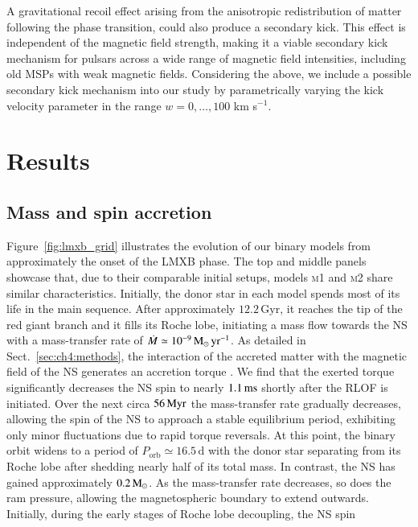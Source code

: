 \documentclass[main.tex]{subfiles}
\begin{document}
    A gravitational recoil effect arising from the anisotropic redistribution of matter following the phase transition, could also produce a secondary kick. This effect is independent of the magnetic field strength, making it a viable secondary kick mechanism for pulsars across a wide range of magnetic field intensities, including old MSPs with weak magnetic fields.
    Considering the above, we include a possible secondary kick mechanism into our study by parametrically varying the kick velocity parameter in the range $w=0, \dots, 100$ km s$^{-1}$.

    \newpage
    \section{Results} \label{sec:ch4:results}
    \subsection{Mass and spin accretion} \label{sec:ch4:pretrans_evolution}
    Figure~\ref{fig:lmxb_grid} illustrates the evolution of our binary models from approximately the onset of the LMXB phase. The top and middle panels showcase that, due to their comparable initial 
    setups,  models \textsc{m1} and \textsc{m2} share similar characteristics. 
    Initially, the donor star in each model spends most of its life in the main sequence. After 
    approximately $12.2\,\text{Gyr}$, it reaches the tip of the red giant branch and it fills its Roche 
    lobe, initiating a mass flow towards the NS with a mass-transfer rate of $\dot{M} \simeq 
    10^{-9}\mathrm{\,M_{\odot}\,yr^{-1}}$. As detailed in Sect.~\ref{sec:ch4:methods}, the interaction of the accreted 
    matter with the magnetic field of the NS generates an accretion torque \citep{Tauris:sc2012}. We find that the exerted torque significantly decreases the NS spin to nearly 
    $1.1\,\rm{ms}$ shortly after the RLOF is initiated.
    Over the next circa $56\,\rm{Myr}$ the mass-transfer rate gradually decreases, allowing the spin of the NS to approach a stable equilibrium period, exhibiting only minor fluctuations due to rapid 
    torque reversals. 
    At this point, the binary orbit widens to a period of $P_\mathrm{orb} \simeq 16.5\,\mathrm{d}$ with the donor star separating from its Roche lobe after shedding nearly half of its total mass. In contrast, the NS has gained approximately $0.2\mathrm{\,M_\odot}$.
    As the mass-transfer rate decreases, so does the ram pressure, allowing the magnetospheric boundary to extend outwards. Initially, during the early stages of Roche lobe decoupling, the NS spin 
\end{document}
